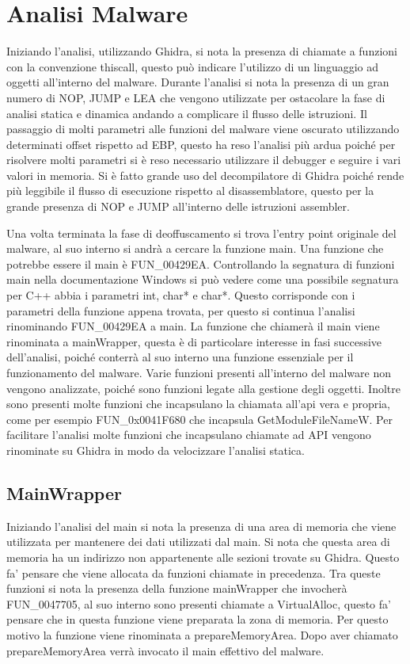 \documentclass[a4paper,12pt]{article}
\begin{document}
\section{Analisi Malware}
Iniziando l'analisi, utilizzando Ghidra, si nota la presenza di chiamate a funzioni con la convenzione thiscall, questo può indicare l'utilizzo di un linguaggio ad oggetti all'interno del malware. Durante l'analisi si nota la presenza di un gran numero di NOP, JUMP e LEA che vengono utilizzate per ostacolare la fase di analisi statica e dinamica andando a complicare il flusso delle istruzioni. Il passaggio di molti parametri alle funzioni del malware viene oscurato utilizzando determinati offset rispetto ad EBP, questo ha reso l'analisi più ardua poiché per risolvere molti parametri si è reso necessario utilizzare il debugger e seguire i vari valori in memoria. Si è fatto grande uso del decompilatore di Ghidra poiché rende più leggibile il flusso di esecuzione rispetto al disassemblatore, questo per la grande presenza di NOP e JUMP all'interno delle istruzioni assembler.

Una volta terminata la fase di deoffuscamento si trova l'entry point originale del malware, al suo interno si andrà a cercare la funzione main. Una funzione che potrebbe essere il main è FUN\_00429EA. Controllando la segnatura di funzioni main nella documentazione Windows si può vedere come una possibile segnatura per C++ abbia i parametri int, char* e char*. Questo corrisponde con i parametri della funzione appena trovata, per questo si continua l'analisi rinominando FUN\_00429EA a main. La funzione che chiamerà il main viene rinominata a mainWrapper, questa è di particolare interesse in fasi successive dell'analisi, poiché conterrà al suo interno una funzione essenziale per il funzionamento del malware. 
 Varie funzioni presenti all'interno del malware non vengono analizzate, poiché sono funzioni legate alla gestione degli oggetti.  Inoltre sono presenti molte funzioni che incapsulano la chiamata all'api vera e propria, come per esempio FUN\_0x0041F680 che incapsula GetModuleFileNameW. Per facilitare l'analisi molte funzioni che incapsulano chiamate ad API vengono rinominate su Ghidra in modo da velocizzare l'analisi statica. 

\subsection{MainWrapper}
Iniziando l'analisi del main si nota la presenza di una area di memoria che viene utilizzata per mantenere dei dati utilizzati dal main. Si nota che questa area di memoria ha un indirizzo non appartenente alle sezioni trovate su Ghidra. Questo fa' pensare che viene allocata da funzioni chiamate in precedenza. Tra queste funzioni si nota la presenza della funzione mainWrapper che invocherà FUN\_0047705, al suo interno sono presenti chiamate a VirtualAlloc, questo fa' pensare che in questa funzione viene preparata la zona di memoria. 
Per questo motivo la funzione viene rinominata a prepareMemoryArea. Dopo aver chiamato prepareMemoryArea verrà invocato il main effettivo del malware.
\end{document}
